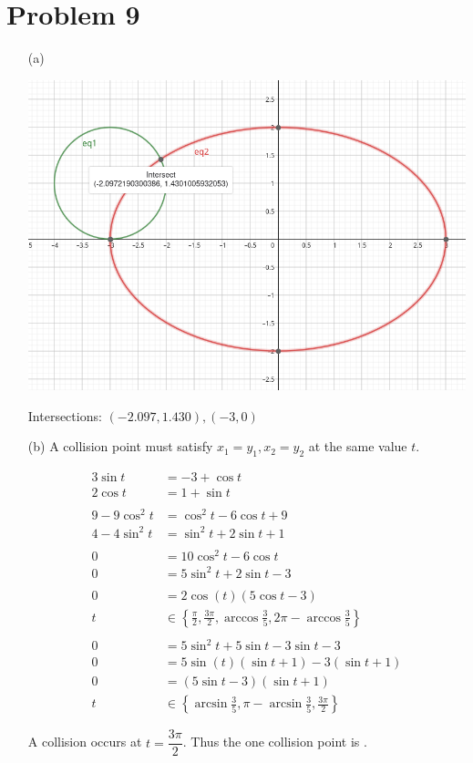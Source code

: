 \documentclass{article}
\begin{document}
\section*{Problem 9}
\begin{itemize}
\item[(a)]
	\phantom{}
	\vspace*{-25pt}
	\begin{center}
		\includegraphics*[width=0.82\linewidth]{q9a.png}
	\end{center}
	Intersections: $(-2.097,1.430),(-3,0)$

\item[(b)]
	A collision point must satisfy $x_1=y_1,x_2=y_2$ at the same value $t$.

	\begin{align*}
		3\sin t&=-3+\cos t \\
		2\cos t&=1+\sin t \\
		\\
		9-9\cos^2t&=\cos^2t-6\cos t+9 \\
		4-4\sin^2t&=\sin^2t+2\sin t+1 \\
		\\
		0&=10\cos^2t-6\cos t \\
		0&=5\sin^2t+2\sin t-3 \\
		\\
		0&=2\cos(t)(5\cos t-3) \\
		t&\in\left\{\frac{\pi}{2},\frac{3\pi}{2},\arccos\frac{3}{5},2\pi-\arccos\frac{3}{5}\right\} \\
		\\
		0&=5\sin^2t+5\sin t-3\sin t-3 \\
		0&=5\sin(t)(\sin t+1)-3(\sin t+1) \\
		0&=(5\sin t-3)(\sin t+1) \\
		t&\in\left\{\arcsin\frac{3}{5},\pi-\arcsin\frac{3}{5},\frac{3\pi}{2}\right\}
	\end{align*}

	A collision occurs at $t=\dfrac{3\pi}{2}$. Thus the one collision point is .

\end{itemize}
\end{document}
